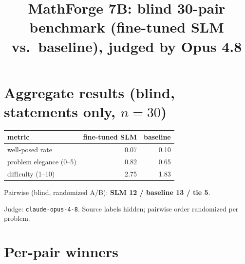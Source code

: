 \documentclass[11pt]{article}
\title{MathForge 7B: blind 30-pair benchmark (fine-tuned SLM vs.\ baseline), judged by Opus 4.8}\date{}
\begin{document}
\maketitle

\section*{Aggregate results (blind, statements only, $n=30$)}

\begin{tabular}{lrr}

metric & fine-tuned SLM & baseline \\ \hline

well-posed rate & 0.07 & 0.10 \\

problem elegance (0--5) & 0.82 & 0.65 \\

difficulty (1--10) & 2.75 & 1.83 \\

\end{tabular}

\medskip

Pairwise (blind, randomized A/B): \textbf{SLM 12 / baseline 13 / tie 5}.

\medskip

Judge: \texttt{claude-opus-4-8}. Source labels hidden; pairwise order randomized per problem.

\section*{Per-pair winners}
\end{document}
